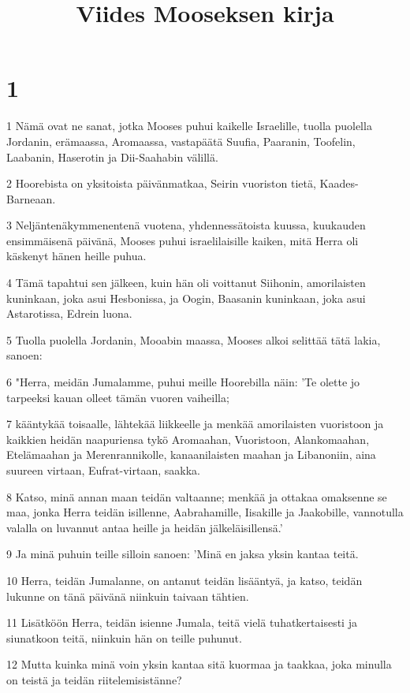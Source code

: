

\title{Viides Mooseksen kirja}


\chapter{1}

\par 1 Nämä ovat ne sanat, jotka Mooses puhui kaikelle Israelille, tuolla puolella Jordanin, erämaassa, Aromaassa, vastapäätä Suufia, Paaranin, Toofelin, Laabanin, Haserotin ja Dii-Saahabin välillä.
\par 2 Hoorebista on yksitoista päivänmatkaa, Seirin vuoriston tietä, Kaades-Barneaan.
\par 3 Neljäntenäkymmenentenä vuotena, yhdennessätoista kuussa, kuukauden ensimmäisenä päivänä, Mooses puhui israelilaisille kaiken, mitä Herra oli käskenyt hänen heille puhua.
\par 4 Tämä tapahtui sen jälkeen, kuin hän oli voittanut Siihonin, amorilaisten kuninkaan, joka asui Hesbonissa, ja Oogin, Baasanin kuninkaan, joka asui Astarotissa, Edrein luona.
\par 5 Tuolla puolella Jordanin, Mooabin maassa, Mooses alkoi selittää tätä lakia, sanoen:
\par 6 "Herra, meidän Jumalamme, puhui meille Hoorebilla näin: 'Te olette jo tarpeeksi kauan olleet tämän vuoren vaiheilla;
\par 7 kääntykää toisaalle, lähtekää liikkeelle ja menkää amorilaisten vuoristoon ja kaikkien heidän naapuriensa tykö Aromaahan, Vuoristoon, Alankomaahan, Etelämaahan ja Merenrannikolle, kanaanilaisten maahan ja Libanoniin, aina suureen virtaan, Eufrat-virtaan, saakka.
\par 8 Katso, minä annan maan teidän valtaanne; menkää ja ottakaa omaksenne se maa, jonka Herra teidän isillenne, Aabrahamille, Iisakille ja Jaakobille, vannotulla valalla on luvannut antaa heille ja heidän jälkeläisillensä.'
\par 9 Ja minä puhuin teille silloin sanoen: 'Minä en jaksa yksin kantaa teitä.
\par 10 Herra, teidän Jumalanne, on antanut teidän lisääntyä, ja katso, teidän lukunne on tänä päivänä niinkuin taivaan tähtien.
\par 11 Lisätköön Herra, teidän isienne Jumala, teitä vielä tuhatkertaisesti ja siunatkoon teitä, niinkuin hän on teille puhunut.
\par 12 Mutta kuinka minä voin yksin kantaa sitä kuormaa ja taakkaa, joka minulla on teistä ja teidän riitelemisistänne?
